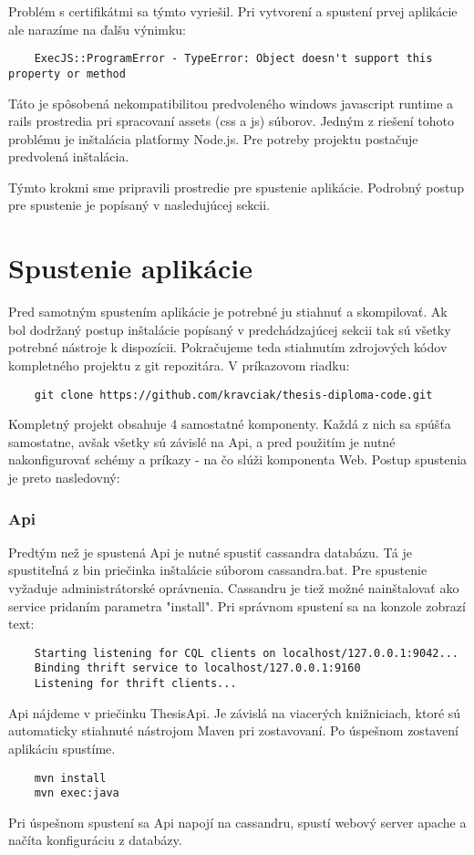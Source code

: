 	Problém s certifikátmi sa týmto vyriešil. Pri vytvorení a spustení prvej aplikácie ale narazíme na ďalšu výnimku:
	\begin{lstlisting}
	ExecJS::ProgramError - TypeError: Object doesn't support this property or method
	\end{lstlisting}
	Táto je spôsobená nekompatibilitou predvoleného windows javascript runtime a rails prostredia pri spracovaní assets (css a js) súborov. Jedným z riešení tohoto problému je inštalácia platformy Node.js. Pre potreby projektu postačuje predvolená inštalácia.
	
	Týmto krokmi sme pripravili prostredie pre spustenie aplikácie. Podrobný postup pre spustenie je popísaný v nasledujúcej sekcii.

\section{Spustenie aplikácie}
	Pred samotným spustením aplikácie je potrebné ju stiahnuť a skompilovať. Ak bol dodržaný postup inštalácie popísaný v predchádzajúcej sekcii tak sú všetky potrebné nástroje k dispozícii. Pokračujeme teda stiahnutím zdrojových kódov kompletného projektu z git repozitára. V príkazovom riadku:
	\begin{lstlisting}
	git clone https://github.com/kravciak/thesis-diploma-code.git
	\end{lstlisting}
	Kompletný projekt obsahuje 4 samostatné komponenty. Každá z nich sa spúšťa samostatne, avšak všetky sú závislé na Api, a pred použitím je nutné nakonfigurovať schémy a príkazy - na čo slúži komponenta Web. Postup spustenia je preto nasledovný:
	
\subsubsection{Api}
	Predtým než je spustená Api je nutné spustiť cassandra databázu. Tá je spustiteľná z bin priečinka inštalácie súborom cassandra.bat. Pre spustenie vyžaduje administrátorské oprávnenia. Cassandru je tiež možné nainštalovať ako service pridaním parametra "install". Pri správnom spustení sa na konzole zobrazí text:
	\begin{lstlisting}
	Starting listening for CQL clients on localhost/127.0.0.1:9042...
	Binding thrift service to localhost/127.0.0.1:9160
	Listening for thrift clients...
	\end{lstlisting}
	
	Api nájdeme v priečinku ThesisApi. Je závislá na viacerých knižniciach, ktoré sú automaticky stiahnuté nástrojom Maven pri zostavovaní. Po úspešnom zostavení aplikáciu spustíme.
	\begin{lstlisting}
	mvn install
	mvn exec:java
	\end{lstlisting}
	Pri úspešnom spustení sa Api napojí na cassandru, spustí webový server apache a načíta konfiguráciu z databázy.
	
